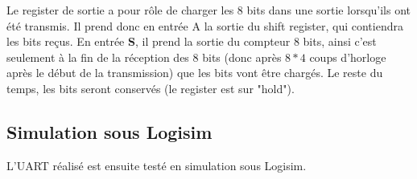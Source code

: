 \documentclass[a4paper]{article} %
\begin{document}
\begin{tcolorbox}[colframe=Monokaimagenta,colback=white]
Le register de sortie a pour rôle de charger les 8 bits dans une sortie lorsqu'ils ont été transmis. Il prend donc en entrée A la sortie du shift register, qui contiendra les bits reçus. En entrée \textbf{S}, il prend la sortie du compteur 8 bits, ainsi c'est seulement à la fin de la réception des 8 bits (donc après $8*4$ coups d'horloge après le début de la transmission) que les bits vont être chargés. Le reste du temps, les bits seront conservés (le register est sur "hold").\\

\end{tcolorbox}

 \subsection{Simulation sous Logisim}
L’UART réalisé est ensuite testé en simulation sous Logisim.
\end{document}
